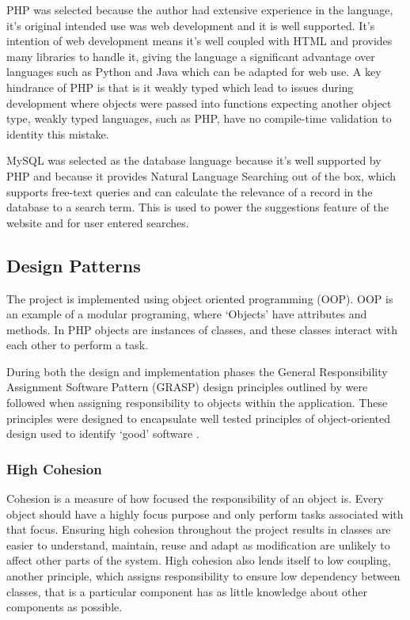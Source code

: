 PHP was selected because the author had extensive experience in the language, it's original intended use was web development and it is well supported. It's intention of web development means it's well coupled with HTML and provides many libraries to handle it, giving the language a significant advantage over languages such as Python and Java which can be adapted for web use. A key hindrance of PHP is that is it weakly typed which lead to issues during development where objects were passed into functions expecting another object type, weakly typed languages, such as PHP, have no compile-time validation to identity this mistake. 

MySQL was selected as the database language because it's well supported by PHP and because it provides Natural Language Searching out of the box, which supports free-text queries and can calculate the relevance of a record in the database to a search term. This is used to power the suggestions feature of the website and for user entered searches.

\subsection{Design Patterns}
The project is implemented using object oriented programming (OOP). OOP is an example of a modular programing, where `Objects' have attributes and methods. In PHP objects are instances of classes, and these classes interact with each other to perform a task.

During both the design and implementation phases the General Responsibility Assignment Software Pattern (GRASP) design principles outlined by   were followed when assigning responsibility to objects within the application. These principles were designed to encapsulate well tested principles of object-oriented design used to identify `good' software \parencite{larman1997applying}.

\subsubsection{High Cohesion}
Cohesion is a measure of how focused the responsibility of an object is. Every object should have a highly focus purpose and only perform tasks associated with that focus. Ensuring high cohesion throughout the project results in classes are easier to understand, maintain, reuse and adapt as modification are unlikely to affect other parts of the system. High cohesion also lends itself to low coupling, another principle, which assigns responsibility to ensure low dependency between classes, that is a particular component has as little knowledge about other components as possible.

